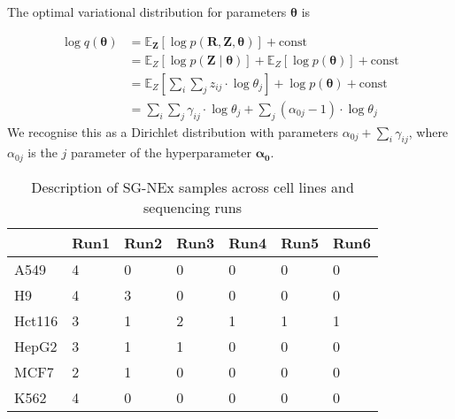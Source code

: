 The optimal variational distribution for parameters $\boldsymbol{\theta}$ is

\begin{equation}
\begin{split}
    \log q(\boldsymbol{\theta})&=\mathbb{E}_{\boldsymbol{Z}}[\log p(\boldsymbol{R}, \boldsymbol{Z}, \boldsymbol{\theta})]+\mathrm{const} \\
    &= \mathbb{E}_{Z}[\log p(\boldsymbol{Z} \mid \boldsymbol{\theta})]+\mathbb{E}_{Z}[\log p(\boldsymbol{\theta})]+\mathrm{const} \\
    &= \mathbb{E}_{Z}\left[\sum_{i} \sum_{j} z_{i j} \cdot \log \theta_{j}\right]+\log p(\boldsymbol{\theta})+\mathrm{const} \\
    &=\sum_{i} \sum_{j} \gamma_{i j} \cdot \log \theta_{j}+\sum_{j}\left(\alpha_{0 j}-1\right) \cdot \log \theta_{j}
\end{split}
\end{equation}
We recognise this as a Dirichlet distribution with parameters $\alpha_{0 j}+\sum_{i} \gamma_{i j}$, where $\alpha_{0j}$ is the $j$ parameter of the hyperparameter $\bm{\alpha_0}$. 



\begin{table}[H]
  \centering
    \begin{tabular}{|p{1.5cm}|p{1.5cm}|p{1.5cm}|p{1.5cm}|p{1.5cm}|p{1.5cm}|p{1.5cm}|}
\cline{2-7}    \multicolumn{1}{l|}{} & Run1  & Run2  & Run3  & Run4  & Run5  & Run6 \bigstrut\\
    \hline
    A549  & 4     & 0     & 0     & 0     & 0     & 0 \bigstrut\\
    \hline
    H9    & 4     & 3     & 0     & 0     & 0     & 0 \bigstrut\\
    \hline
    Hct116 & 3     & 1     & 2     & 1     & 1     & 1 \bigstrut\\
    \hline
    HepG2 & 3     & 1     & 1     & 0     & 0     & 0 \bigstrut\\
    \hline
    MCF7  & 2     & 1     & 0     & 0     & 0     & 0 \bigstrut\\
    \hline
    K562  & 4     & 0     & 0     & 0     & 0     & 0 \bigstrut\\
    \hline
    \end{tabular}%
      \caption[Description of SG-NEx samples across cell lines and sequencing runs]{Description of SG-NEx samples across cell lines and sequencing runs}
  \label{tab:six-six}%
\end{table}%